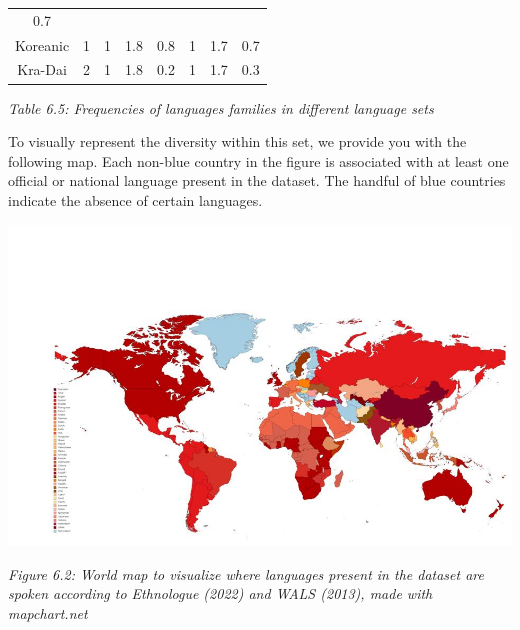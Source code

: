 \begin{center}
{\begin{tabular}{|c|c|c|c|c|c|c|c|}
0.7\\ 

Koreanic & 
	

1& 
	

1& 
	

1.8& 
	

0.8& 
	

1& 
	

1.7& 
	

0.7\\ 

Kra-Dai &
	

2& 
	

1& 
	

1.8& 
	

0.2& 
	

1& 
	

1.7& 
	

0.3\\ 

\end{tabular}
}
\vspace{0.1cm}
{\it \footnotesize Table 6.5: Frequencies of languages families in different language sets}
\end{center}

\noindent To visually represent the diversity within this set, we provide you with the following map. Each non-blue country in the figure is associated with at least one official or national language present in the dataset. The handful of blue countries indicate the absence of certain languages.  

\begin{center}
\includegraphics[scale=0.4]{./Images/worldatlas.jpg}

	{\it \footnotesize Figure 6.2: World map to visualize where languages present in the dataset are spoken according to Ethnologue (2022) and WALS (2013), made with mapchart.net} 
\end{center}

